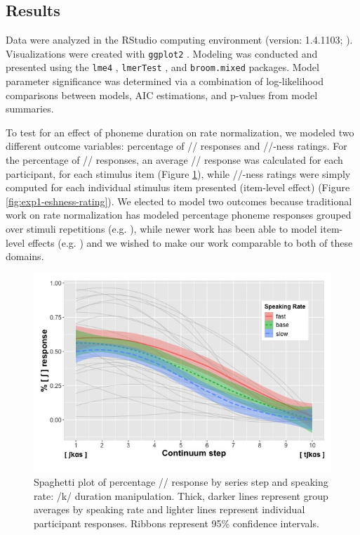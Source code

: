 \subsection{Results}

Data were analyzed in the RStudio computing environment (version: 1.4.1103; \citealt{rstudioteamRStudioIntegratedDevelopment2020}). Visualizations were created with \texttt{ggplot2} \citep{wickhamGgplot2ElegantGraphics2016}. Modeling was conducted and presented using the \texttt{lme4} \citep{batesFittingLinearMixedeffects2015}, \texttt{lmerTest} \citep{kuznetsovaLmerTestPackageTests2017}, and \texttt{broom.mixed} \citep{bolkerBroomMixedTidying2020} packages. Model parameter significance was determined via a combination of log-likelihood comparisons between models, AIC estimations, and p-values from model summaries.  

To test for an effect of phoneme duration on rate normalization, we modeled two different outcome variables: percentage of /\textesh/ responses and /\textesh/-ness ratings. For the percentage of /\textesh/ responses, an average /\textesh/ response was calculated for each participant, for each stimulus item (Figure \ref{fig:exp1-response-function}), while /\textesh/-ness ratings were simply computed for each individual stimulus item presented (item-level effect) (Figure \ref{fig:exp1-eshness-rating}). We elected to model two outcomes because traditional work on rate normalization has modeled percentage phoneme responses grouped over stimuli repetitions (e.g. \citealt{diehlAuditoryBasisStimulus1989}), while newer work has been able to model item-level effects (e.g. \citealt{maslowskiHowTrackingHabitual2019}) and we wished to make our work comparable to both of these domains.

\begin{figure}[H]
\centering
\includegraphics[scale=.5]{figures/exp1-percen.jpeg}
\caption{\label{fig:exp1-response-function} Spaghetti plot of percentage /\textesh/ response by series step and speaking rate: /k/ duration manipulation. Thick, darker lines represent group averages by speaking rate and lighter lines represent individual participant responses. Ribbons represent 95\% confidence intervals.}
\end{figure}

